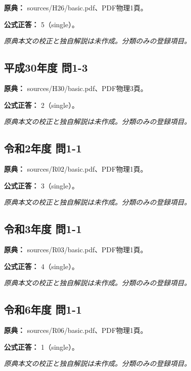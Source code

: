 \noindent\textbf{原典：} sources/H26/basic.pdf、PDF物理1頁。

\textbf{公式正答：} 5（single）。

\par\textit{原典本文の校正と独自解説は未作成。分類のみの登録項目。}

\subsection{平成30年度 問1-3}
\label{q:h30-reg-basic-1-3}

\noindent\textbf{原典：} sources/H30/basic.pdf、PDF物理3頁。

\textbf{公式正答：} 2（single）。

\par\textit{原典本文の校正と独自解説は未作成。分類のみの登録項目。}

\subsection{令和2年度 問1-1}
\label{q:r02-reg-basic-1-1}

\noindent\textbf{原典：} sources/R02/basic.pdf、PDF物理1頁。

\textbf{公式正答：} 3（single）。

\par\textit{原典本文の校正と独自解説は未作成。分類のみの登録項目。}

\subsection{令和3年度 問1-1}
\label{q:r03-reg-basic-1-1}

\noindent\textbf{原典：} sources/R03/basic.pdf、PDF物理1頁。

\textbf{公式正答：} 4（single）。

\par\textit{原典本文の校正と独自解説は未作成。分類のみの登録項目。}

\subsection{令和6年度 問1-1}
\label{q:r06-reg-basic-1-1}

\noindent\textbf{原典：} sources/R06/basic.pdf、PDF物理1頁。

\textbf{公式正答：} 1（single）。

\par\textit{原典本文の校正と独自解説は未作成。分類のみの登録項目。}

